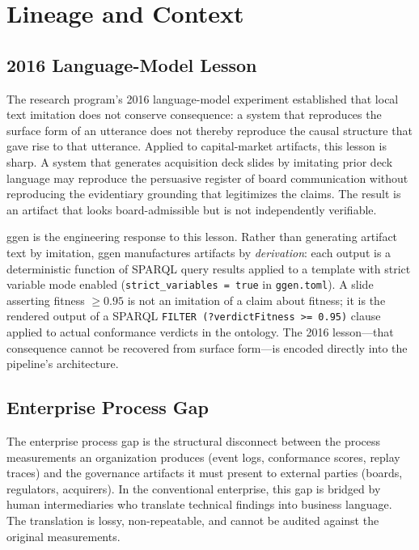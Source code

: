 
\section{Lineage and Context}
\label{sec:ggen-lineage}

\subsection{2016 Language-Model Lesson}
\label{sec:ggen-lineage-2016}

The research program's 2016 language-model experiment established that local text imitation does
not conserve consequence: a system that reproduces the surface form of an utterance does not
thereby reproduce the causal structure that gave rise to that utterance. Applied to capital-market
artifacts, this lesson is sharp. A system that generates acquisition deck slides by imitating
prior deck language may reproduce the persuasive register of board communication without
reproducing the evidentiary grounding that legitimizes the claims. The result is an artifact that
looks board-admissible but is not independently verifiable.

ggen is the engineering response to this lesson. Rather than generating artifact text by
imitation, ggen manufactures artifacts by \emph{derivation}: each output is a deterministic
function of SPARQL query results applied to a template with strict variable mode enabled
(\texttt{strict\_variables = true} in \texttt{ggen.toml}). A slide asserting fitness $\geq 0.95$
is not an imitation of a claim about fitness; it is the rendered output of a SPARQL
\texttt{FILTER (?verdictFitness >= 0.95)} clause applied to actual conformance verdicts in the
ontology. The 2016 lesson---that consequence cannot be recovered from surface form---is encoded
directly into the pipeline's architecture.

\subsection{Enterprise Process Gap}
\label{sec:ggen-lineage-enterprise-gap}

The enterprise process gap is the structural disconnect between the process measurements an
organization produces (event logs, conformance scores, replay traces) and the governance
artifacts it must present to external parties (boards, regulators, acquirers). In the conventional
enterprise, this gap is bridged by human intermediaries who translate technical findings into
business language. The translation is lossy, non-repeatable, and cannot be audited against the
original measurements.

